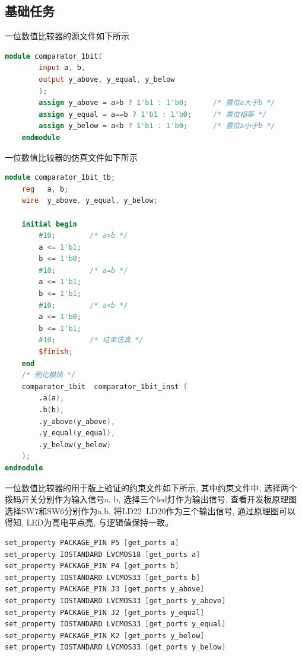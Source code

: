 \documentclass{article}
\begin{document}
\subsection*{基础任务}
一位数值比较器的源文件如下所示\\
\begin{lstlisting}[language=Verilog, caption={一位数值比较器源文件}]
    module comparator_1bit(
        input a, b,
        output y_above, y_equal, y_below
        );
        assign y_above = a>b ? 1'b1 : 1'b0;      /* 置位a大于b */
        assign y_equal = a==b ? 1'b1 : 1'b0;     /* 置位相等 */
        assign y_below = a<b ? 1'b1 : 1'b0;      /* 置位a小于b */
    endmodule
\end{lstlisting}
一位数值比较器的仿真文件如下所示\\
\begin{lstlisting}[language=Verilog, caption={一位数值比较器测试平台}]
    module comparator_1bit_tb;
    reg   a, b;
    wire  y_above, y_equal, y_below;

    initial begin
        #10;        /* a>b */
        a <= 1'b1;
        b <= 1'b0;
        #10;        /* a=b */
        a <= 1'b1;
        b <= 1'b1;
        #10;        /* a<b */
        a <= 1'b0;
        b <= 1'b1;
        #10;        /* 结束仿真 */
        $finish;
    end
    /* 例化模块 */
    comparator_1bit  comparator_1bit_inst (
        .a(a),
        .b(b),
        .y_above(y_above),
        .y_equal(y_equal),
        .y_below(y_below)
    );
endmodule
\end{lstlisting}
一位数值比较器的用于版上验证的约束文件如下所示, 其中约束文件中, 选择两个拨码开关分别作为输入信号a, b,
选择三个led灯作为输出信号, 查看开发板原理图选择SW7和SW6分别作为a,b, 将LD22~LD20作为三个输出信号, 通过原理图可以得知, LED为高电平点亮, 与逻辑值保持一致。\\
\begin{lstlisting}[language=Verilog, caption={一位数值比较器约束文件}]
set_property PACKAGE_PIN P5 [get_ports a]
set_property IOSTANDARD LVCMOS18 [get_ports a]
set_property PACKAGE_PIN P4 [get_ports b]
set_property IOSTANDARD LVCMOS33 [get_ports b]
set_property PACKAGE_PIN J3 [get_ports y_above]
set_property IOSTANDARD LVCMOS33 [get_ports y_above]
set_property PACKAGE_PIN J2 [get_ports y_equal]
set_property IOSTANDARD LVCMOS33 [get_ports y_equal]
set_property PACKAGE_PIN K2 [get_ports y_below]
set_property IOSTANDARD LVCMOS33 [get_ports y_below]
\end{lstlisting}
\end{document}

